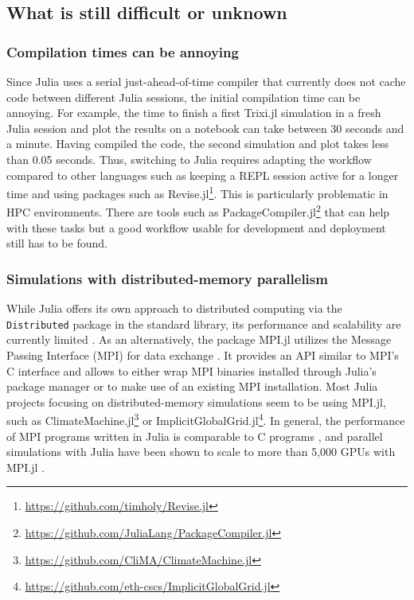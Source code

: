 \documentclass[hidelinks]{juliacon} %
\newcommand{\trixi}{Trixi.jl\xspace}
\begin{document}
\subsection{What is still difficult or unknown}

\subsubsection{Compilation times can be annoying}

Since Julia uses a serial just-ahead-of-time compiler that currently does not cache
code between different Julia sessions, the initial compilation time can be
annoying. For example, the time to finish a first \trixi simulation in a fresh Julia
session and plot the results on a notebook can take between 30 seconds and a
minute. Having compiled the code, the second simulation and plot takes less than
0.05 seconds. Thus, switching to Julia requires adapting the workflow compared
to other languages such as keeping a REPL session active for a longer time and
using packages such as Revise.jl\footnote{\url{https://github.com/timholy/Revise.jl}}.
This is particularly problematic in HPC environments. There are tools such as
PackageCompiler.jl\footnote{\url{https://github.com/JuliaLang/PackageCompiler.jl}}
that can help with these tasks but a good workflow usable for development and
deployment still has to be found.

\subsubsection{Simulations with distributed-memory parallelism}

While Julia offers its own approach to distributed computing via the \lstinline{Distributed} package
in the standard library, its performance and scalability are currently limited \cite{byrne2021mpi}.
As an alternatively, the package MPI.jl utilizes the Message Passing Interface (MPI) for data
exchange \cite{byrne2021mpi}. It provides an API similar to MPI's C interface and allows to either
wrap MPI binaries installed through Julia's package manager or to make use of an existing MPI
installation.  Most Julia projects focusing on distributed-memory simulations seem to be using
MPI.jl, such as ClimateMachine.jl\footnote{\url{https://github.com/CliMA/ClimateMachine.jl}} or
ImplicitGlobalGrid.jl\footnote{\url{https://github.com/eth-cscs/ImplicitGlobalGrid.jl}}.  In
general, the performance of MPI programs written in Julia is comparable to C programs
\cite{hunold2020benchmarking}, and parallel simulations with Julia have been shown to scale
to more than 5{,}000 GPUs with MPI.jl \cite{omlin2020solving}.
\end{document}
